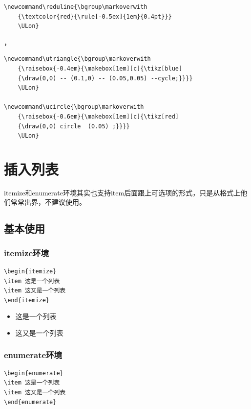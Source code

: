 \documentclass[12pt,oneside]{book}
\begin{document}
\begin{common-format}
\begin{Verbatim}
\newcommand\reduline{\bgroup\markoverwith
    {\textcolor{red}{\rule[-0.5ex]{1em}{0.4pt}}}
    \ULon}
\end{Verbatim}

，

\begin{Verbatim}
\newcommand\utriangle{\bgroup\markoverwith
    {\raisebox{-0.4em}{\makebox[1em][c]{\tikz[blue]
    {\draw(0,0) -- (0.1,0) -- (0.05,0.05) --cycle;}}}}
    \ULon}

\newcommand\ucircle{\bgroup\markoverwith
    {\raisebox{-0.6em}{\makebox[1em][c]{\tikz[red]
    {\draw(0,0) circle  (0.05) ;}}}}
    \ULon}
\end{Verbatim}




\section{插入列表}
itemize和enumerate环境其实也支持item后面跟上可选项的形式，只是从格式上他们常常出界，不建议使用。
\subsection{基本使用}
\subsubsection{itemize环境}
\begin{Verbatim}
\begin{itemize}
\item 这是一个列表
\item 这又是一个列表
\end{itemize}
\end{Verbatim}


\begin{itemize}
\item 这是一个列表
\item 这又是一个列表
\end{itemize}



\subsubsection{enumerate环境}
\begin{Verbatim}
\begin{enumerate}
\item 这是一个列表
\item 这又是一个列表
\end{enumerate}
\end{Verbatim}


\end{common-format}
\end{document}
